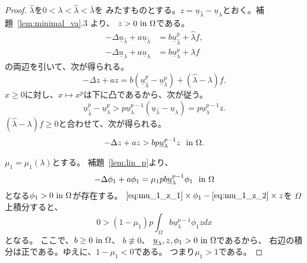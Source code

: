 \begin{proof}
 $\hat{\lambda}$を$0 < \lambda < \hat{\lambda} < \bar{\lambda}$を
 みたすものとする。$z = \underline{u}_{\hat{\lambda}} -
 \underline{u}_\lambda$とおく。補題~\ref{lem:minimal_va}.3 より、
 $z > 0 ~\text{in}~ \Omega$である。
 \begin{align*}
  -\Delta \underline{u}_{\hat{\lambda}} + a \underline{u}_{\hat{\lambda}} &= b
  \underline{u}_{\hat{\lambda}}^p + \hat{\lambda} f, \\   
  -\Delta \underline{u}_{\lambda} + a \underline{u}_\lambda &= b
  \underline{u}_\lambda^p + \lambda f
 \end{align*}
 の両辺を引いて、次が得られる。
 \[
  -\Delta z + az = b (\underline{u}_{\hat{\lambda}}^p -
 \underline{u}_\lambda^p)
 + (\hat{\lambda} - \lambda) f.
 \]
 $x \geq 0$に対し、$x \mapsto x^p$は下に凸であるから、次が従う。
 \[
  \underline{u}_{\hat{\lambda}}^p - \underline{u}_\lambda^p > 
 p \underline{u}_\lambda^{p-1} (\underline{u}_{\hat{\lambda}} -
 \underline{u}_\lambda) = p \underline{u}_\lambda^{p-1} z.
 \]
 $(\hat{\lambda} - \lambda) f \geq 0$と合わせて、次が得られる。
 \begin{equation}
  -\Delta z + az > bp \underline{u}_\lambda^{p-1} z  \ \ \text{in}~ \Omega.
   \label{eq:mu_1_z_1}
 \end{equation}

 $\mu_1 = \mu_1(\lambda)$とする。
 補題~\ref{lem:lin_p}より、
 \begin{equation}
  -\Delta \phi_1 + a \phi_1 =
   \mu_1 p b \underline{u}_\lambda^{p-1} \phi_1  \ \ \text{in}~ \Omega
   \label{eq:mu_1_z_2}
 \end{equation}
 となる$\phi_1 > 0 ~\text{in}~ \Omega$が存在する。
 $ \text{\eqref{eq:mu_1_z_1}} \times \phi_1 - 
 \text{\eqref{eq:mu_1_z_2}} \times z$を
 $\Omega$上積分すると、
 \[
  0 > (1 - \mu_1) p \int_\Omega b \underline{u}_\lambda^{p-1} \phi_1 z dx
 \]
 となる。
 ここで、$b \geq 0 ~\text{in}~ \Omega$、
 $b \not \equiv 0$、
 $\underline{u}_\lambda, z, \phi_1 > 0 ~\text{in}~ \Omega$であるから、
 右辺の積分は正である。ゆえに、$1 - \mu_1 < 0$である。
 つまり$\mu_1 > 1$である。 \qedhere
\end{proof}

